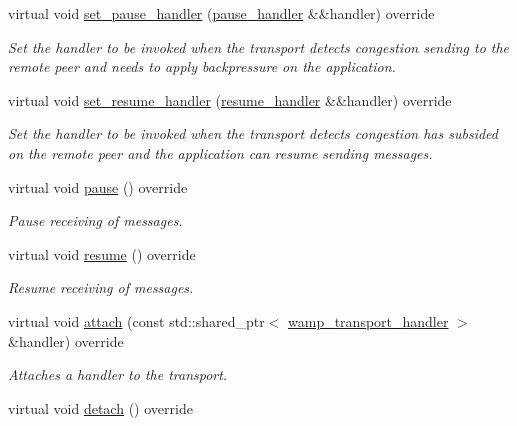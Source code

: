 \begin{DoxyCompactItemize}
virtual void \hyperlink{classautobahn_1_1wamp__rawsocket__transport_a7a5dc1e0f1de859864b7905a5317fab1}{set\+\_\+pause\+\_\+handler} (\hyperlink{classautobahn_1_1wamp__transport_a834b28db4d03bdb3ff77a4638cc2867d}{pause\+\_\+handler} \&\&handler) override
\begin{DoxyCompactList}\small\item\em Set the handler to be invoked when the transport detects congestion sending to the remote peer and needs to apply backpressure on the application. \end{DoxyCompactList}\item 
virtual void \hyperlink{classautobahn_1_1wamp__rawsocket__transport_a9659a6451e8fd027a08bfb39b8273b94}{set\+\_\+resume\+\_\+handler} (\hyperlink{classautobahn_1_1wamp__transport_ad36057ec27420793db7d8d658f3f003c}{resume\+\_\+handler} \&\&handler) override
\begin{DoxyCompactList}\small\item\em Set the handler to be invoked when the transport detects congestion has subsided on the remote peer and the application can resume sending messages. \end{DoxyCompactList}\item 
virtual void \hyperlink{classautobahn_1_1wamp__rawsocket__transport_a9bfdec8d0028004c4b4fd6e64df10f7f}{pause} () override
\begin{DoxyCompactList}\small\item\em Pause receiving of messages. \end{DoxyCompactList}\item 
virtual void \hyperlink{classautobahn_1_1wamp__rawsocket__transport_a1182039f8f8d0649075eb97ab912ad22}{resume} () override
\begin{DoxyCompactList}\small\item\em Resume receiving of messages. \end{DoxyCompactList}\item 
virtual void \hyperlink{classautobahn_1_1wamp__rawsocket__transport_a54bb783139b338d587347f1ed865b94c}{attach} (const std\+::shared\+\_\+ptr$<$ \hyperlink{classautobahn_1_1wamp__transport__handler}{wamp\+\_\+transport\+\_\+handler} $>$ \&handler) override
\begin{DoxyCompactList}\small\item\em Attaches a handler to the transport. \end{DoxyCompactList}\item 
virtual void \hyperlink{classautobahn_1_1wamp__rawsocket__transport_a9622ba671182807e0f8e9abce9bb6ab9}{detach} () override

\end{DoxyCompactItemize}
